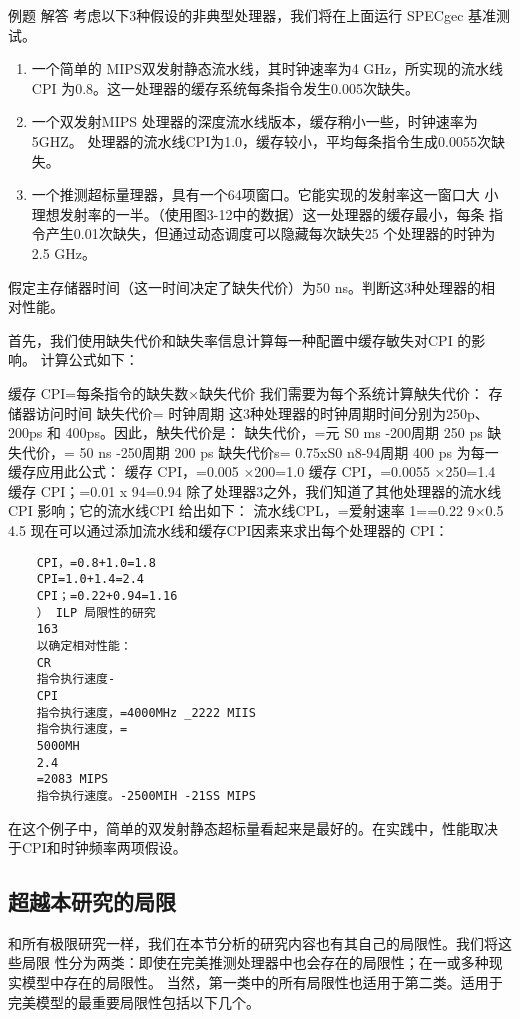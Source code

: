 例题
解答
考虑以下3种假设的非典型处理器，我们将在上面运行 SPECgec 基准测试。

\begin{enumerate}
    \item 一个简单的 MIPS双发射静态流水线，其时钟速率为4 GHz，所实现的流水线
    CPI 为0.8。这一处理器的缓存系统每条指令发生0.005次缺失。
    \item 一个双发射MIPS 处理器的深度流水线版本，缓存稍小一些，时钟速率为5GHZ。
    处理器的流水线CPI为1.0，缓存较小，平均每条指令生成0.0055次缺失。
    \item 一个推测超标量理器，具有一个64项窗口。它能实现的发射率这一窗口大
    小理想发射率的一半。（使用图3-12中的数据）这一处理器的缓存最小，每条
    指令产生0.01次缺失，但通过动态调度可以隐藏每次缺失25%
    个处理器的时钟为2.5 GHz。
\end{enumerate}

假定主存储器时间（这一时间决定了缺失代价）为50 ns。判断这3种处理器的相
对性能。

首先，我们使用缺失代价和缺失率信息计算每一种配置中缓存敏失对CPI 的影响。
计算公式如下：

缓存 CPI=每条指令的缺失数×缺失代价
我们需要为每个系统计算觖失代价：
存储器访问时间
缺失代价=
时钟周期
这3种处理器的时钟周期时间分别为250p、200ps 和 400ps。因此，觖失代价是：
缺失代价，=元
S0 ms -200周期
250 ps
缺失代价，=
50 ns -250周期
200 ps
缺失代价s=
0.75xS0 n8-94周期
400 ps
为每一缓存应用此公式：
缓存 CPI，=0.005 ×200=1.0
缓存 CPI，=0.0055 ×250=1.4
缓存 CPI；=0.01 x 94=0.94
除了处理器3之外，我们知道了其他处理器的流水线 CPI 影响；它的流水线CPI
给出如下：
流水线CPL，=爱射速率
1==0.22
9×0.5
4.5
现在可以通过添加流水线和缓存CPI因素来求出每个处理器的 CPI：
\begin{verbatim}
    CPI，=0.8+1.0=1.8
    CPI=1.0+1.4=2.4
    CPI；=0.22+0.94=1.16
    ） ILP 局限性的研究
    163
    以确定相对性能：
    CR
    指令执行速度-
    CPI
    指令执行速度，=4000MHz _2222 MIIS
    指令执行速度，=
    5000MH
    2.4
    =2083 MIPS
    指令执行速度。-2500MIH -21SS MIPS
\end{verbatim}
在这个例子中，简单的双发射静态超标量看起来是最好的。在实践中，性能取决
于CPI和时钟频率两项假设。
\subsection{超越本研究的局限}
和所有极限研究一样，我们在本节分析的研究内容也有其自己的局限性。我们将这些局限
性分为两类：即使在完美推测处理器中也会存在的局限性；在一或多种现实模型中存在的局限性。
当然，第一类中的所有局限性也适用于第二类。适用于完美模型的最重要局限性包括以下几个。

